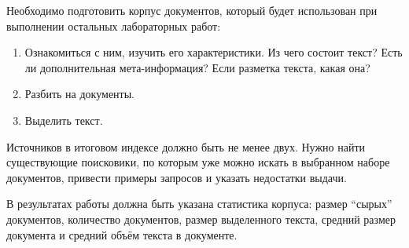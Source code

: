 
Необходимо подготовить корпус документов, который будет использован при выполнении
остальных лабораторных работ:
\begin{enumerate}
    \item Ознакомиться с ним, изучить его характеристики. Из чего состоит текст? Есть ли
          дополнительная мета-информация? Если разметка текста, какая она?
    \item Разбить на документы.
    \item Выделить текст.
\end{enumerate}

Источников в итоговом индексе должно быть не менее двух. Нужно найти существующие
поисковики, по которым уже можно искать в выбранном наборе документов, привести примеры
запросов и указать недостатки выдачи.

В результатах работы должна быть указана статистика корпуса: размер \enquote{сырых}
документов, количество документов, размер выделенного текста, средний размер документа и
средний объём текста в документе.

\pagebreak
